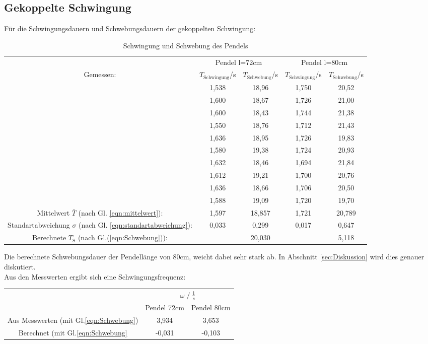 \subsection{Gekoppelte Schwingung}
Für die Schwingungsdauern und Schwebungsdauern der gekoppelten Schwingung:
\begin{table}
    \centering
    \label{tab:Data_schw}
    \caption{Schwingung und Schwebung des Pendels}
    \begin{tabular}{c c | c || c | c}
        \toprule
        & \multicolumn{2}{c}{Pendel l=72cm} & \multicolumn{2}{c}{Pendel l=80cm} \\
        \cmidrule(lr){2-3}\cmidrule(lr){4-5}
        Gemessen: & $T_\text{Schwingung}$\;/\;s & $T_\text{Schwebung}$\;/\;s & $T_\text{Schwingung}$\;/\;s & $T_\text{Schwebung}$\;/\;s\\
        \midrule
        & 1,538 & 18,96 & 1,750 & 20,52 \\   
        & 1,600 & 18,67 & 1,726 & 21,00 \\
        & 1,600 & 18,43 & 1,744 & 21,38 \\
        & 1,550 & 18,76 & 1,712 & 21,43 \\
        & 1,636 & 18,95 & 1,726 & 19,83 \\
        & 1,580 & 19,38 & 1,724 & 20,93 \\
        & 1,632 & 18,46 & 1,694 & 21,84 \\
        & 1,612 & 19,21 & 1,700 & 20,76 \\
        & 1,636 & 18,66 & 1,706 & 20,50 \\
        & 1,588 & 19,09 & 1,720 & 19,70 \\
        \midrule
        Mittelwert $\bar{T}$ (nach Gl. \ref{eqn:mittelwert}): & 1,597 & 18,857 & 1,721 & 20,789 \\
        Standartabweichung $\sigma$ (nach Gl. \ref{eqn:standartabweichung}): & 0,033 & 0,299 & 0,017 &  0,647 \\
        Berechnete $T_\textrm{S}$ (nach Gl.(\ref{eqn:Schwebung})):  &       & 20,030 &       &  5,118 \\
        \bottomrule
    \end{tabular}
\end{table}
Die berechnete Schwebungsdauer der Pendellänge von 80cm, weicht dabei sehr stark ab. In Abschnitt \ref{sec:Diskussion} wird dies genauer diskutiert.\\

Aus den Messwerten ergibt sich eine Schwingungsfrequenz:
\begin{table}
    \centering
    \label{tab:frq_gleichs}
    \begin{tabular}{c c c}
        \toprule
        & \multicolumn{2}{c}{$\omega\;/\;\frac{1}{s}$}\\
        \cmidrule(lr){2-3} 
        & Pendel 72cm & Pendel 80cm\\
        \midrule
        Aus Messwerten (mit Gl.\ref{eqn:Schwebung}) & 3,934 & 3,653 \\
        Berechnet (mit Gl.\ref{eqn:Schwebung}      & -0,031 & -0,103 \\
        \bottomrule
    \end{tabular}
\end{table}

